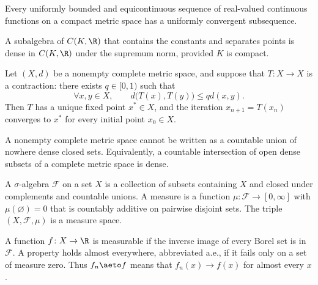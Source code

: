     \begin{theorem}
        Every uniformly bounded and equicontinuous sequence of real-valued
        continuous functions on a compact metric space has a uniformly
        convergent subsequence.
    \end{theorem}

    \begin{theorem}
        A subalgebra of $C(K,\R)$ that contains the constants and separates
        points is dense in $C(K,\R)$ under the supremum norm, provided $K$ is
        compact.
    \end{theorem}

    \begin{theorem}
        Let $(X,d)$ be a nonempty complete metric space, and suppose that
        $T\colon X\to X$ is a contraction: there exists $q\in[0,1)$ such that
        \[
            \forall x,y\in X,
            \qquad
            d\bigl(T(x),T(y)\bigr)\leq qd(x,y).
        \]
        Then $T$ has a unique fixed point $x^\ast\in X$, and the iteration
        $x_{n+1}=T(x_n)$ converges to $x^\ast$ for every initial point $x_0\in X$.
    \end{theorem}

    \begin{theorem}
        A nonempty complete metric space cannot be written as a countable union
        of nowhere dense closed sets. Equivalently, a countable intersection of
        open dense subsets of a complete metric space is dense.
    \end{theorem}

    \begin{definition}
        A $\sigma$-algebra $\mathcal{F}$ on a set $X$ is a collection of subsets
        containing $X$ and closed under complements and countable unions. A
        measure is a function $\mu\colon \mathcal{F}\to[0,\infty]$ with
        $\mu(\varnothing)=0$ that is countably additive on pairwise disjoint
        sets. The triple $(X,\mathcal{F},\mu)$ is a measure space.

        A function $f\colon X\to\R$ is measurable if the inverse image of every Borel
        set is in $\mathcal{F}$. A property holds almost everywhere, abbreviated
        a.e., if it fails only on a set of measure zero. Thus $f_n\aeto f$ means
        that $f_n(x)\to f(x)$ for almost every $x$.
    \end{definition}

